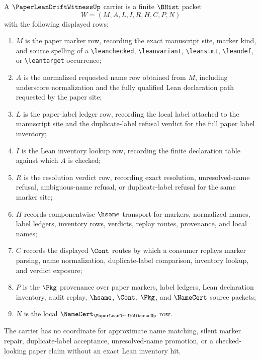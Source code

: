 \begin{definition}
\label{def:paper-lean-drift-witness-carrier}
A $\PaperLeanDriftWitnessUp$ carrier is a finite $\BHist$ packet
$$
W=(M,A,L,I,R,H,C,P,N)
$$
with the following displayed rows:
\begin{enumerate}
\item $M$ is the paper marker row, recording the exact manuscript site, marker kind, and source spelling of a \texttt{\textbackslash leanchecked}, \texttt{\textbackslash leanvariant}, \texttt{\textbackslash leanstmt}, \texttt{\textbackslash leandef}, or \texttt{\textbackslash leantarget} occurrence;
\item $A$ is the normalized requested name row obtained from $M$, including underscore normalization and the fully qualified Lean declaration path requested by the paper site;
\item $L$ is the paper-label ledger row, recording the local label attached to the manuscript site and the duplicate-label refusal verdict for the full paper label inventory;
\item $I$ is the Lean inventory lookup row, recording the finite declaration table against which $A$ is checked;
\item $R$ is the resolution verdict row, recording exact resolution, unresolved-name refusal, ambiguous-name refusal, or duplicate-label refusal for the same marker site;
\item $H$ records componentwise $\hsame$ transport for markers, normalized names, label ledgers, inventory rows, verdicts, replay routes, provenance, and local names;
\item $C$ records the displayed $\Cont$ routes by which a consumer replays marker parsing, name normalization, duplicate-label comparison, inventory lookup, and verdict exposure;
\item $P$ is the $\Pkg$ provenance over paper markers, label ledgers, Lean declaration inventory, audit replay, $\hsame$, $\Cont$, $\Pkg$, and $\NameCert$ source packets;
\item $N$ is the local $\NameCert_{\PaperLeanDriftWitnessUp}$ row.
\end{enumerate}
The carrier has no coordinate for approximate name matching, silent marker repair, duplicate-label acceptance, unresolved-name promotion, or a checked-looking paper claim without an exact Lean inventory hit.
\end{definition}


